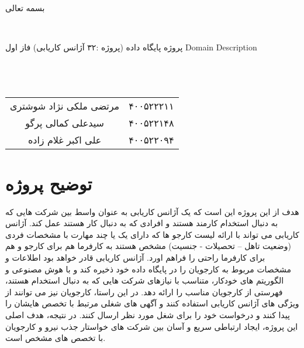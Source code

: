 \documentclass{article}
\begin{document}
	\begin{center}
		بسمه تعالی
	\end{center}

	~\\
	\setlength{\tabcolsep}{64pt}
	\Large
	
	\begin{center}
		
		پروژه پایگاه داده (پروژه :۳۲ آژانس کاریابی) فاز اول
		\newline
		Domain Description
		~\\
		~\\
		~\\
		~\\
		
		
		\begin{tabular}{ c c }
مرتضی ملکی نژاد شوشتری & ۴۰۰۵۲۲۲۱۱ \\
سیدعلی کمالی پرگو & ۴۰۰۵۲۲۱۴۸ \\ 
علی اکبر غلام زاده & ۴۰۰۵۲۲۰۹۴ 
		\end{tabular}
	\end{center}
	
	\begin{center}
		
	\end{center}



	\onehalfspacing
	\normalsize
	\tableofcontents
	\newpage
	\section{توضیح پروژه}

			هدف از این پروژه این است که یک آژانس کاریابی به عنوان واسط بین شرکت هایی که به دنبال استخدام کارمند هستند و افرادی که به دنبال کار هستند عمل کند. آژانس کاریابی می تواند با ارائه لیست کارجو ها که دارای یک یا چند مهارت با مشخصات فردی (وضعیت تاهل – تحصیلات - جنسیت) مشخص هستند به کارفرما هم برای کارجو و هم برای کارفرما راحتی را فراهم اورد. آژانس کاریابی قادر خواهد بود اطلاعات و مشخصات مربوط به کارجویان را در پایگاه داده خود ذخیره کند و با هوش مصنوعی و الگوریتم های خودکار، متناسب با نیازهای شرکت هایی که به دنبال استخدام هستند، فهرستی از کارجویان مناسب را ارائه دهد. در این راستا، کارجویان نیز می توانند از ویژگی های آژانس کاریابی استفاده کنند و آگهی های شغلی مرتبط با تخصص هایشان را پیدا کنند و درخواست خود را برای شغل مورد نظر ارسال کنند. در نتیجه، هدف اصلی این پروژه، ایجاد ارتباطی سریع و آسان بین شرکت های خواستار جذب نیرو و کارجویان با تخصص های مشخص است. 
			
\end{document}
